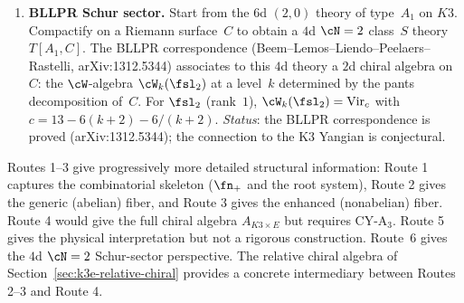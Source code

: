 \begin{enumerate}[label=\textbf{Route \arabic*.}, leftmargin=*]
 \item \textbf{BLLPR Schur sector.} Start from the $6$d $(2,0)$ theory of type~$A_1$ on $K3$. Compactify on a Riemann surface~$C$ to obtain a $4$d $\cN = 2$ class~$S$ theory $T[A_1, C]$. The BLLPR correspondence (Beem--Lemos--Liendo--Peelaers--Rastelli, arXiv:1312.5344) associates to this $4$d theory a $2$d chiral algebra on~$C$: the $\cW$-algebra $\cW_k(\fsl_2)$ at a level~$k$ determined by the pants decomposition of~$C$.  For $\fsl_2$ (rank~$1$), $\cW_k(\fsl_2) = \mathrm{Vir}_{c}$ with $c = 13 - 6(k+2) - 6/(k+2)$.  \emph{Status}: the BLLPR correspondence is proved (arXiv:1312.5344); the connection to the K3 Yangian is conjectural.
\end{enumerate}

\begin{remark}
\label{rem:k3e-route-comparison}
Routes 1--3 give progressively more detailed structural information: Route 1 captures the combinatorial skeleton ($\fn_+$ and the root system), Route 2 gives the generic (abelian) fiber, and Route 3 gives the enhanced (nonabelian) fiber. Route 4 would give the full chiral algebra $A_{K3 \times E}$ but requires CY-A$_3$. Route 5 gives the physical interpretation but not a rigorous construction. Route~6 gives the $4$d $\cN = 2$ Schur-sector perspective. The relative chiral algebra of Section~\ref{sec:k3e-relative-chiral} provides a concrete intermediary between Routes 2--3 and Route 4.
\end{remark}

